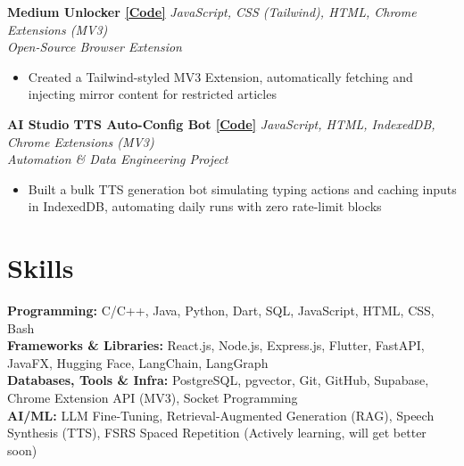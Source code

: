 \documentclass[letterpaper,11pt]{article}
\newcommand{\cvproject}[3]{%
  \noindent
  \textbf{#1} \hfill \textit{#2} \\
  \textit{#3}
}
\begin{document}
\vspace{4pt}

\cvproject
  {Medium Unlocker \href{https://github.com/rishofficial/medium_unlock}{\small[Code]}}
  {JavaScript, CSS (Tailwind), HTML, Chrome Extensions (MV3)}
  {Open-Source Browser Extension}
\begin{itemize}[leftmargin=*, noitemsep, topsep=1pt, parsep=0pt]
  \item Created a Tailwind-styled MV3 Extension, automatically fetching and injecting mirror content for restricted articles
\end{itemize}

\vspace{4pt}

\cvproject
  {AI Studio TTS Auto-Config Bot \href{https://github.com/rishofficial/GoogleAiStudio_tts_bot}{\small[Code]}}
  {JavaScript, HTML, IndexedDB, Chrome Extensions (MV3)}
  {Automation \& Data Engineering Project}
\begin{itemize}[leftmargin=*, noitemsep, topsep=1pt, parsep=0pt]
  \item Built a bulk TTS generation bot simulating typing actions and caching inputs in IndexedDB, automating daily runs with zero rate-limit blocks
\end{itemize}

\vspace{8pt}

\section{Skills}

\noindent
\textbf{Programming:} C/C++, Java, Python, Dart, SQL, JavaScript, HTML, CSS, Bash \\
\textbf{Frameworks \& Libraries:} React.js, Node.js, Express.js, Flutter, FastAPI, JavaFX, Hugging Face, LangChain, LangGraph \\
\textbf{Databases, Tools \& Infra:} PostgreSQL, pgvector, Git, GitHub, Supabase, Chrome Extension API (MV3), Socket Programming \\
\textbf{AI/ML:} LLM Fine-Tuning, Retrieval-Augmented Generation (RAG), Speech Synthesis (TTS), FSRS Spaced Repetition (Actively learning, will get better soon)
\end{document}
